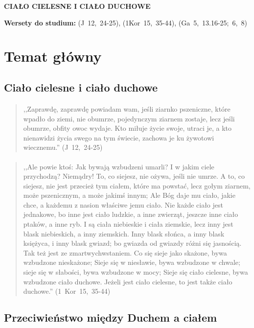\documentclass[10pt,a4paper,oneside]{article}
\begin{document}
\centerline{\textbf{\MakeUppercase{Ciało cielesne i ciało duchowe}}}
\begin{center}
\textbf{Wersety do studium:} 
\mbox{(J 12, 24-25)}, \mbox{(1Kor 15, 35-44)}, \mbox{(Ga 5, 13.16-25; 6, 8)}
\end{center}
\section{Temat główny}
\subsection{Ciało cielesne i ciało duchowe}
\paragraph{}
\begin{quote}
,,Zaprawdę, zaprawdę powiadam wam, jeśli ziarnko pszeniczne, które wpadło do ziemi, nie obumrze, pojedynczym ziarnem zostaje, lecz jeśli obumrze, obfity owoc wydaje. Kto miłuje życie swoje, utraci je, a kto nienawidzi życia swego na tym świecie, zachowa je ku żywotowi wiecznemu.'' \mbox{(J 12, 24-25)}
\end{quote}
\paragraph{}
\begin{quote}
,,Ale powie ktoś: Jak bywają wzbudzeni umarli? I w jakim ciele przychodzą? Niemądry! To, co siejesz, nie ożywa, jeśli nie umrze. A to, co siejesz, nie jest przecież tym ciałem, które ma powstać, lecz gołym ziarnem, może pszenicznym, a może jakimś innym; Ale Bóg daje mu ciało, jakie chce, a każdemu z nasion właściwe jemu ciało. Nie każde ciało jest jednakowe, bo inne jest ciało ludzkie, a inne zwierząt, jeszcze inne ciało ptaków, a inne ryb. I są ciała niebieskie i ciała ziemskie, lecz inny jest blask niebieskich, a inny ziemskich. Inny blask słońca, a inny blask księżyca, i inny blask gwiazd; bo gwiazda od gwiazdy różni się jasnością. Tak też jest ze zmartwychwstaniem. Co się sieje jako skażone, bywa wzbudzone nieskażone; Sieje się w niesławie, bywa wzbudzone w chwale; sieje się w słabości, bywa wzbudzone w mocy; Sieje się ciało cielesne, bywa wzbudzone ciało duchowe. Jeżeli jest ciało cielesne, to jest także ciało duchowe.'' \mbox{(1 Kor 15, 35-44)}
\end{quote}
\subsection{Przeciwieństwo między Duchem a ciałem}
\end{document}

